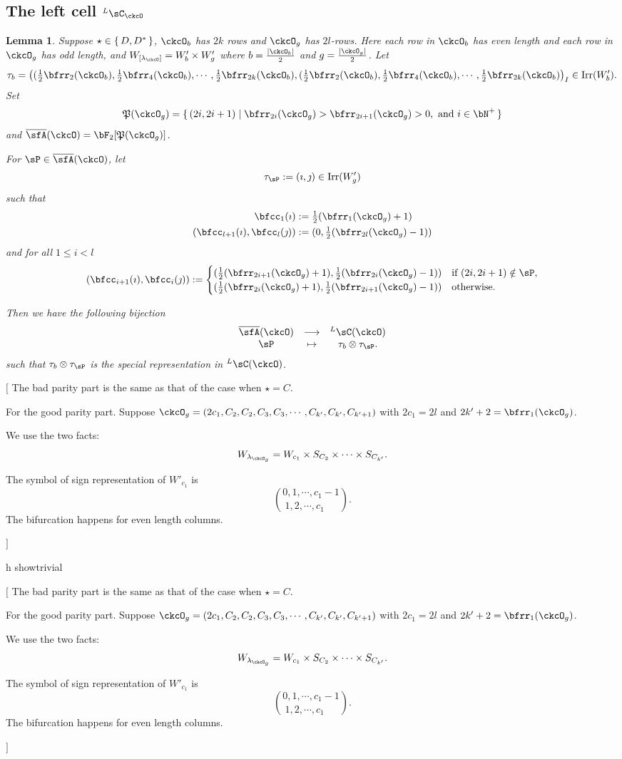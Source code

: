 \documentclass[12pt,a4paper]{amsart}
\newcommand{\trivial}[2][]{\if\relax\detokenize{#1}\relax
  {%
      \color{orange} \vspace{0em} $[$  #2 $]$
      \color{black}
  }
  \else
\ifx#1h
\ifcsname showtrivial\endcsname
{%
    \color{orange} \vspace{0em}  $[$ #2 $]$
    \color{black}
}
\fi
\else {\red Wrong argument!} \fi
\fi
}
\def\abs#1{\left|{#1}\right|}
\newcommand{\CQ}{{\mathcal {Q}}}
\numberwithin{equation}{section}
\newtheorem{lem}[thm]{Lemma}
\theoremstyle{remark}
\def\half{{\tfrac{1}{2}}}
\def\Irr{\mathrm{Irr}}
\def\lamckg{\lambda_{\ckcO_g}}
\def\WLamck{W_{[\lambda_{\ckcO}]}}
\def\LC{{}^L\sC}
\def\CQ{\overline{\sfA}}%
\def\CPP{\mathfrak{P}}
\begin{document}
\subsection{The left cell $\LC_{\ckcO}$}

\begin{lem}
  Suppose $\star \in \set{D, D^{*}}$, $\ckcO_{b}$ has $2k$ rows and $\ckcO_{g}$
  has $2l$-rows. Here each row in $\ckcO_{b}$ has even length and each row in
  $\ckcO_{g}$ has odd length, and $\WLamck = W'_{b}\times W'_{g}$ where
  $b= \frac{\abs{\ckcO_{b}}}{2}$ and $g = \frac{\abs{\ckcO_{g}}}{2}$. Let
  \[
    \tau_{b} = \left( (\half\bfrr_{2}(\ckcO_{b}), \half\bfrr_{4}(\ckcO_{b}),\cdots, \half\bfrr_{2k}(\ckcO_{b}), (\half\bfrr_{2}(\ckcO_{b}), \half\bfrr_{4}(\ckcO_{b}),\cdots, \half\bfrr_{2k}(\ckcO_{b}) \right)_{I}\in \Irr(W'_{b}).
  \]
  Set
  \[
    \CPP(\ckcO_{g}) = \set{(2i,2i+1)| \bfrr_{2i}(\ckcO_{g})> \bfrr_{2i+1}(\ckcO_{g})>0, \text{
        and } i\in \bN^{+}}
  \]
  and $\CQ(\ckcO)= \bF_{2}[\CPP(\ckcO_{g})]$.

  For $\sP \in \CQ(\ckcO)$, let
  \[
    \tau_{\sP} := (\imath,\jmath) \in \Irr(W'_{g})
  \]
  such that
  \[
    \begin{split}
      \bfcc_{1}(\imath)  &:= \half(\bfrr_{1}(\ckcO_{g})+1)\\
      (\bfcc_{l+1}(\imath), \bfcc_{l}(\jmath))  &:= (0,\half(\bfrr_{2l}(\ckcO_{g})-1))
    \end{split}
  \]
  and for all $1\leq i< l$
  \[
  (\bfcc_{i+1}(\imath), \bfcc_{i}(\jmath)):=
  \begin{cases}
    (\half (\bfrr_{2i+1}(\ckcO_{g})+1),
    \half (\bfrr_{2i}(\ckcO_{g})-1))
    & \text{if } (2i,2i+1)\notin \sP,\\
    (\half (\bfrr_{2i}(\ckcO_{g})+1),\half (\bfrr_{2i+1}(\ckcO_{g})-1)) & \text{otherwise.}
  \end{cases}
  \]

  Then we have the following bijection
  \[
    \begin{array}{ccc}
      \CQ(\ckcO) &\longrightarrow & \LC(\ckcO)\\
      \sP & \mapsto & \tau_{b}\otimes \tau_{\sP}.
    \end{array}
  \]
  such that $\tau_{b}\otimes \tau_{\sP}$ is the special representation in
  $\LC(\ckcO)$.
\end{lem}
\trivial{
  The bad parity part is the same as that of the case when $\star = C$.

  For the good parity part.
  Suppose
  $\ckcO_{g} = (2c_{1}, C_{2}, C_{2},C_{3},C_{3},\cdots, C_{k'},C_{k'},C_{k'+1})$ with
  $2c_{1}=2l$ and $2k'+2 = \bfrr_{1}(\ckcO_{g})$.

  We use the two facts:
  \[
    W_{\lamckg} = W_{c_{1}}\times S_{C_{2}}\times \cdots
    \times S_{C_{k'}}.
  \]

  The symbol of sign representation of $W'_{c_{1}}$ is
  \[
    \binom{0,1, \cdots, c_{1}-1}{1,2, \cdots, c_{1}\phantom{-1}}.
  \]
  The bifurcation happens for even length columns.

}
\end{document}
